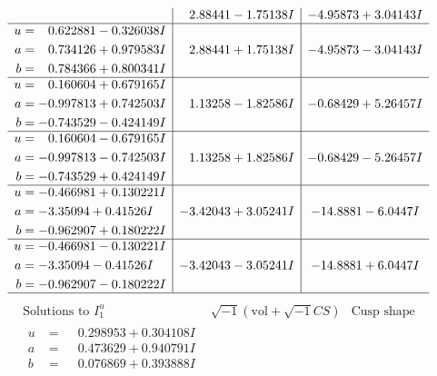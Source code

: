 \documentclass[1p]{elsarticle_modified}
\theoremstyle{definition}
\newcommand{\I}{\sqrt{-1}}
\begin{document}
$$\begin{array}{c|c|c}
 & \phantom{-}2.88441 - 1.75138 I & -4.95873 + 3.04143 I \\ \hline\begin{aligned}
u &= \phantom{-}0.622881 - 0.326038 I \\
a &= \phantom{-}0.734126 + 0.979583 I \\
b &= \phantom{-}0.784366 + 0.800341 I\end{aligned}
 & \phantom{-}2.88441 + 1.75138 I & -4.95873 - 3.04143 I \\ \hline\begin{aligned}
u &= \phantom{-}0.160604 + 0.679165 I \\
a &= -0.997813 + 0.742503 I \\
b &= -0.743529 - 0.424149 I\end{aligned}
 & \phantom{-}1.13258 - 1.82586 I & -0.68429 + 5.26457 I \\ \hline\begin{aligned}
u &= \phantom{-}0.160604 - 0.679165 I \\
a &= -0.997813 - 0.742503 I \\
b &= -0.743529 + 0.424149 I\end{aligned}
 & \phantom{-}1.13258 + 1.82586 I & -0.68429 - 5.26457 I \\ \hline\begin{aligned}
u &= -0.466981 + 0.130221 I \\
a &= -3.35094 + 0.41526 I \\
b &= -0.962907 + 0.180222 I\end{aligned}
 & -3.42043 + 3.05241 I & -14.8881 - 6.0447 I \\ \hline\begin{aligned}
u &= -0.466981 - 0.130221 I \\
a &= -3.35094 - 0.41526 I \\
b &= -0.962907 - 0.180222 I\end{aligned}
 & -3.42043 - 3.05241 I & -14.8881 + 6.0447 I\\
 \hline 
 \end{array}$$\newpage$$\begin{array}{c|c|c}  
\text{Solutions to }I^u_{1}& \I (\text{vol} + \sqrt{-1}CS) & \text{Cusp shape}\\
 \hline 
\begin{aligned}
u &= \phantom{-}0.298953 + 0.304108 I \\
a &= \phantom{-}0.473629 + 0.940791 I \\
b &= \phantom{-}0.076869 + 0.393888 I\end{aligned}

\end{array}$$
\end{document}
